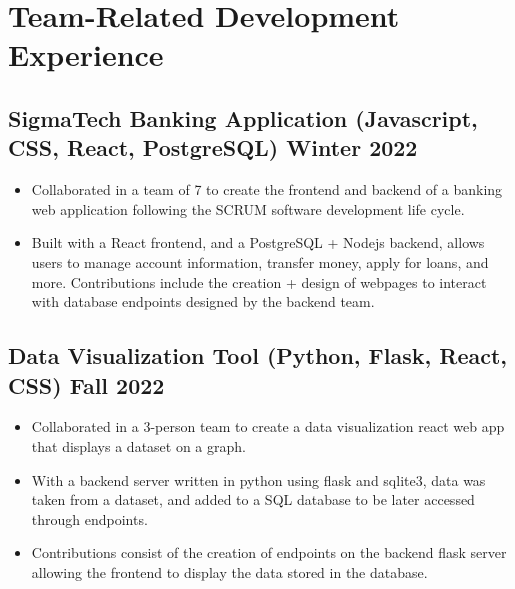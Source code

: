 \documentclass[10pt]{article}
\begin{document}
\section{Team-Related Development Experience}


\subsection{SigmaTech Banking Application (Javascript, CSS, React, PostgreSQL) \hfill Winter 2022}
\begin{itemize}
  \item Collaborated in a team of 7 to create the frontend and backend of a banking web application following the SCRUM software development life cycle.
  \item Built with a React frontend, and a PostgreSQL + Nodejs backend, allows users to manage account information, transfer money, apply for loans, and more.
        Contributions include the creation + design of webpages to interact with database endpoints designed by the backend team.
\end{itemize}

\subsection{Data Visualization Tool (Python, Flask, React, CSS) \hfill Fall 2022}
\begin{itemize}
  \item Collaborated in a 3-person team to create a data visualization react web app that displays a dataset on a graph.
  \item With a backend server written in python using flask and sqlite3, data was taken from a dataset, and added to a SQL database to be later accessed through endpoints.
  \item Contributions consist of the creation of endpoints on the backend flask server allowing the frontend to display the data stored in the database.
\end{itemize}
\end{document}
